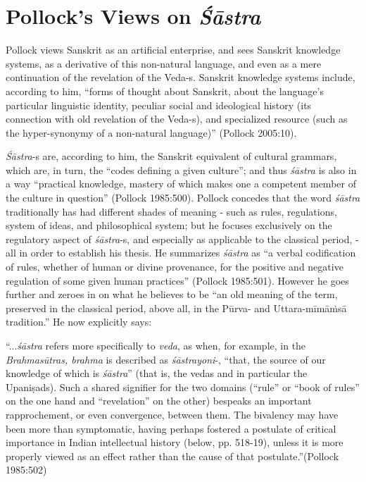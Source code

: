 \section*{Pollock’s Views on {\sl\bfseries Śāstra}}

Pollock views Sanskrit as an artificial enterprise, and sees Sanskrit knowledge systems, as a derivative of this non-natural language, and even as a mere continuation of the revelation of the Veda-s. Sanskrit knowledge systems include, according to him,  ``forms of thought about Sanskrit, about the language's particular linguistic identity, peculiar social and ideological history (its connection with old revelation of the Veda-s), and specialized resource (such as the hyper-synonymy of a non-natural language)'' (Pollock 2005:10). 

{\sl Śāstra}-s are, according to him, the Sanskrit equivalent of cultural grammars, which are, in turn, the ``codes defining a given culture''; and thus {\sl śāstra} is also in a way ``practical knowledge, mastery of which makes one a competent member of the culture in question'' (Pollock 1985:500). Pollock concedes that the word {\sl śāstra} traditionally has had different shades of meaning - such as rules, regulations, system of ideas, and philosophical system; but he focuses exclusively on the regulatory aspect of {\sl śāstra}-s, and especially as applicable to the classical period, - all in order to establish his thesis. He summarizes {\sl śāstra} as ``a verbal codification of rules, whether of human or divine provenance, for the positive and negative regulation of some given human practices'' (Pollock 1985:501). However he goes further and zeroes in on what he believes to be ``an old meaning of the term, preserved in the classical period, above all, in the Pūrva- and Uttara-mīmāṁsā tradition.'' He now explicitly says: 
\begin{myquote}
``...{\sl śāstra} refers more specifically to {\sl veda}, as when, for example, in the {\sl Brahmasūtras, brahma} is described as {\sl śāstrayoni}-, ``that, the source of our knowledge of which is {\sl śāstra}'' (that is, the vedas and in particular the Upaniṣads). Such a shared signifier for the two domains (``rule'' or ``book of rules'' on the one hand and ``revelation'' on the other) bespeaks an important rapprochement, or even convergence, between them. The bivalency may have been more than symptomatic, having perhaps fostered a postulate of critical importance in Indian intellectual history (below, pp. 518-19), unless it is more properly viewed as an effect rather than the cause of that postulate.”\hfill 	(Pollock 1985:502)
\end{myquote}

